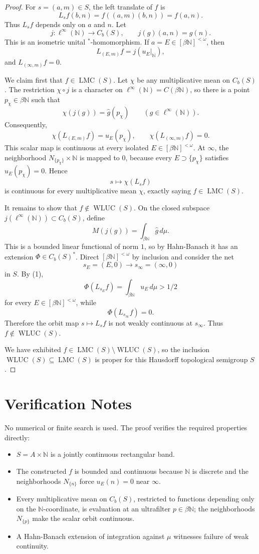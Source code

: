 \documentclass[11pt]{article}
\newcommand{\N}{\mathbb N}
\newcommand{\WLUC}{\operatorname{WLUC}}
\newcommand{\LMC}{\operatorname{LMC}}
\newcommand{\Cb}{C_b}
\newcommand{\betaN}{\beta\N}
\newcommand{\Fin}{[\beta\N]^{<\omega}}
\begin{document}
\begin{proof}
For \(s=(a,m)\in S\), the left translate of \(f\) is
\[
  L_s f(b,n)=f((a,m)(b,n))=f(a,n).
\]
Thus \(L_s f\) depends only on \(a\) and \(n\). Let
\[
  j:\ell^\infty(\N)\longrightarrow \Cb(S),\qquad j(g)(a,n)=g(n).
\]
This is an isometric unital \(^\ast\)-homomorphism. If \(a=E\in\Fin\), then
\[
  L_{(E,m)}f=j(u_E|_{\N}),
\]
and \(L_{(\infty,m)}f=0\).

We claim first that \(f\in \LMC(S)\). Let \(\chi\) be any multiplicative mean
on \(\Cb(S)\). The restriction \(\chi\circ j\) is a character on
\(\ell^\infty(\N)=C(\betaN)\), so there is a point \(p_\chi\in\betaN\) such
that
\[
  \chi(j(g))=\widehat g(p_\chi)\qquad(g\in\ell^\infty(\N)).
\]
Consequently,
\[
  \chi(L_{(E,m)}f)=u_E(p_\chi),\qquad
  \chi(L_{(\infty,m)}f)=0.
\]
This scalar map is continuous at every isolated \(E\in\Fin\). At \(\infty\),
the neighborhood \(N_{\{p_\chi\}}\times \N\) is mapped to \(0\), because
every \(E\supset\{p_\chi\}\) satisfies \(u_E(p_\chi)=0\). Hence
\[
  s\longmapsto \chi(L_s f)
\]
is continuous for every multiplicative mean \(\chi\), exactly saying
\(f\in\LMC(S)\).

It remains to show that \(f\notin\WLUC(S)\). On the closed subspace
\(j(\ell^\infty(\N))\subset\Cb(S)\), define
\[
  M(j(g))=\int_{\betaN}\widehat g\,d\mu .
\]
This is a bounded linear functional of norm \(1\), so by Hahn-Banach it has an
extension \(\Phi\in\Cb(S)^\ast\). Direct \(\Fin\) by inclusion and consider
the net
\[
  s_E=(E,0)\longrightarrow s_\infty=(\infty,0)
\]
in \(S\). By (1),
\[
  \Phi(L_{s_E}f)=\int_{\betaN}u_E\,d\mu>1/2
\]
for every \(E\in\Fin\), while
\[
  \Phi(L_{s_\infty}f)=0.
\]
Therefore the orbit map \(s\mapsto L_s f\) is not weakly continuous at
\(s_\infty\). Thus \(f\notin\WLUC(S)\).

We have exhibited \(f\in \LMC(S)\setminus\WLUC(S)\), so the inclusion
\(\WLUC(S)\subseteq\LMC(S)\) is proper for this Hausdorff topological
semigroup \(S\).
\end{proof}

\section*{Verification Notes}

No numerical or finite search is used. The proof verifies the required
properties directly:
\begin{itemize}
\item \(S=A\times\N\) is a jointly continuous rectangular band.
\item The constructed \(f\) is bounded and continuous because \(\N\) is
discrete and the neighborhoods \(N_{\{n\}}\) force \(u_E(n)=0\) near
\(\infty\).
\item Every multiplicative mean on \(\Cb(S)\), restricted to functions
depending only on the \(\N\)-coordinate, is evaluation at an ultrafilter
\(p\in\betaN\); the neighborhoods \(N_{\{p\}}\) make the scalar orbit
continuous.
\item A Hahn-Banach extension of integration against \(\mu\) witnesses failure
of weak continuity.
\end{itemize}
\end{document}
